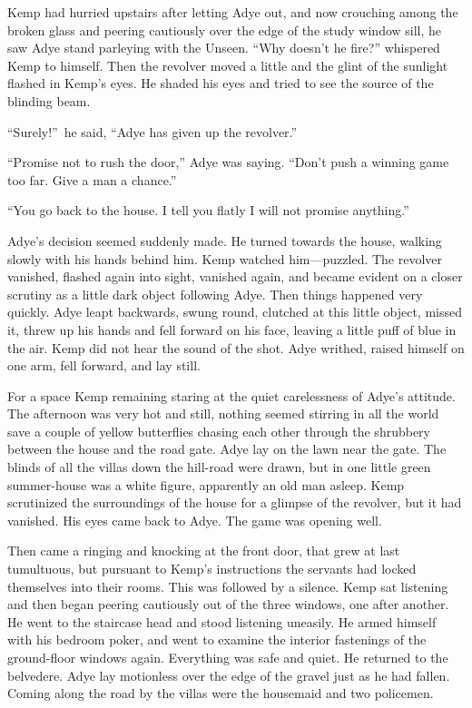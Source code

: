 Kemp had hurried upstairs after letting Adye out, and now crouching among the broken glass and peering cautiously over the edge of the study window sill, he saw Adye stand parleying with the Unseen. “Why doesn’t he fire?” whispered Kemp to himself. Then the revolver moved a little and the glint of the sunlight flashed in Kemp’s eyes. He shaded his eyes and tried to see the source of the blinding beam.

“Surely!”\ he said, “Adye has given up the revolver.”

“Promise not to rush the door,” Adye was saying. “Don’t push a winning game too far. Give a man a chance.”

“You go back to the house. I tell you flatly I will not promise anything.”

Adye’s decision seemed suddenly made. He turned towards the house, walking slowly with his hands behind him. Kemp watched him—puzzled. The revolver vanished, flashed again into sight, vanished again, and became evident on a closer scrutiny as a little dark object following Adye. Then things happened very quickly. Adye leapt backwards, swung round, clutched at this little object, missed it, threw up his hands and fell forward on his face, leaving a little puff of blue in the air. Kemp did not hear the sound of the shot. Adye writhed, raised himself on one arm, fell forward, and lay still.

For a space Kemp remaining staring at the quiet carelessness of Adye’s attitude. The afternoon was very hot and still, nothing seemed stirring in all the world save a couple of yellow butterflies chasing each other through the shrubbery between the house and the road gate. Adye lay on the lawn near the gate. The blinds of all the villas down the hill-road were drawn, but in one little green summer-house was a white figure, apparently an old man asleep. Kemp scrutinized the surroundings of the house for a glimpse of the revolver, but it had vanished. His eyes came back to Adye. The game was opening well.

Then came a ringing and knocking at the front door, that grew at last tumultuous, but pursuant to Kemp’s instructions the servants had locked themselves into their rooms. This was followed by a silence. Kemp sat listening and then began peering cautiously out of the three windows, one after another. He went to the staircase head and stood listening uneasily. He armed himself with his bedroom poker, and went to examine the interior fastenings of the ground-floor windows again. Everything was safe and quiet. He returned to the belvedere. Adye lay motionless over the edge of the gravel just as he had fallen. Coming along the road by the villas were the housemaid and two policemen.

